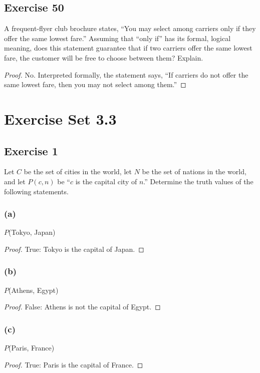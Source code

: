 \documentclass[14pt]{extarticle}
\begin{document}
\subsection{Exercise 50}
A frequent-flyer club brochure states, “You may select among carriers only if they offer the same lowest fare.” Assuming that “only if” has its formal, logical meaning, does this statement guarantee that if two carriers offer the same lowest fare, the customer will be free to choose between them? Explain.

\begin{proof}
No. Interpreted formally, the statement says, “If carriers do not offer the same lowest fare, then you may not select among them.”
\end{proof}

\section{Exercise Set 3.3}
\subsection{Exercise 1}
Let $C$ be the set of cities in the world, let $N$ be the set of nations in the world, and let $P(c, n)$ be “$c$ is the capital city of $n$.” Determine the truth values of the following statements.

\subsubsection{(a)}
$P$(Tokyo, Japan)

\begin{proof}
True: Tokyo is the capital of Japan.
\end{proof}

\subsubsection{(b)}
$P$(Athens, Egypt)

\begin{proof}
False: Athens is not the capital of Egypt.
\end{proof}

\subsubsection{(c)}
$P$(Paris, France)

\begin{proof}
True: Paris is the capital of France.
\end{proof}
\end{document}
